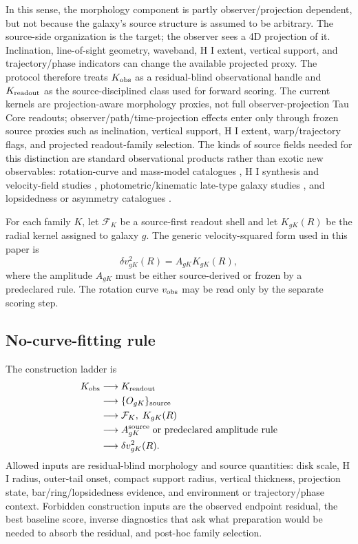\documentclass[11pt]{article}
\begin{document}
In this sense, the morphology component is partly observer/projection
dependent, but not because the galaxy's source structure is assumed to be
arbitrary.  The source-side organization is the target; the observer sees a
4D projection of it.  Inclination, line-of-sight geometry, waveband, H I extent,
vertical support, and trajectory/phase indicators can change the available
projected proxy.  The protocol therefore treats \(K_{\rm obs}\) as a
residual-blind observational handle and \(K_{\rm readout}\) as the
source-disciplined class used for forward scoring.
The current kernels are projection-aware morphology proxies, not full
observer-projection Tau Core readouts; observer/path/time-projection effects
enter only through frozen source proxies such as inclination, vertical support,
H I extent, warp/trajectory flags, and projected readout-family selection.
The kinds of source fields needed for this distinction are standard
observational products rather than exotic new observables: rotation-curve and
mass-model catalogues \cite{Lelli2016SPARC}, H I synthesis and velocity-field
studies \cite{Trachternach2008THINGS,VerheijenSancisi2001UrsaMajorHI},
photometric/kinematic late-type galaxy studies \cite{Spekkens2006RapidRotators},
and lopsidedness or asymmetry catalogues \cite{vanEymeren2011WHISPLopsidedness}.

For each family \(K\), let \(\mathcal{F}_K\) be a source-first readout shell and
let \(K_{gK}(R)\) be the radial kernel assigned to galaxy \(g\).  The generic
velocity-squared form used in this paper is
\[
\delta v_{gK}^2(R)=A_{gK}K_{gK}(R),
\]
where the amplitude \(A_{gK}\) must be either source-derived or frozen by a
predeclared rule.  The rotation curve \(v_{\rm obs}\) may be read only by the
separate scoring step.

\subsection{No-curve-fitting rule}

The construction ladder is
\[
\begin{aligned}
K_{\rm obs}
&\longrightarrow K_{\rm readout}\\
&\longrightarrow \{O_{gK}\}_{\rm source}\\
&\longrightarrow \mathcal{F}_K,\;K_{gK}(R)\\
&\longrightarrow A_{gK}^{\rm source}\;\hbox{or predeclared amplitude rule}\\
&\longrightarrow \delta v_{gK}^2(R).
\end{aligned}
\]
Allowed inputs are residual-blind morphology and source quantities: disk scale,
H I radius, outer-tail onset, compact support radius, vertical thickness,
projection state, bar/ring/lopsidedness evidence, and environment or
trajectory/phase context.  Forbidden construction inputs are the observed endpoint
residual, the best baseline score, inverse diagnostics that ask what
preparation would be needed to absorb the residual, and post-hoc family
selection.
\end{document}
